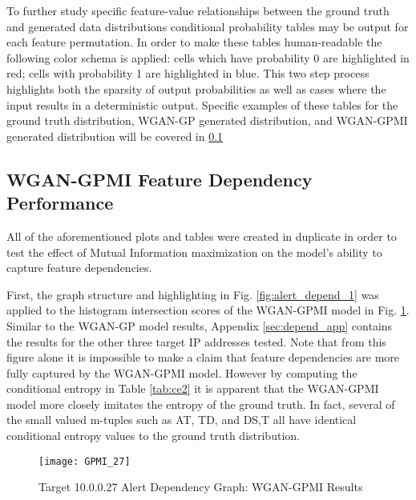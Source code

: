 To further study specific feature-value relationships between the ground truth and generated data distributions conditional probability tables may be output for each feature permutation. In order to make these tables human-readable the following color schema is applied: cells which have probability 0 are highlighted in red; cells with probability 1 are highlighted in blue. This two step process highlights both the sparsity of output probabilities as well as cases where the input results in a deterministic output. Specific examples of these tables for the ground truth distribution, WGAN-GP generated distribution, and WGAN-GPMI generated distribution will be covered in \ref{sec:gpmi_dep}

\subsection{WGAN-GPMI Feature Dependency Performance}
\label{sec:gpmi_dep}

All of the aforementioned plots and tables were created in duplicate in order to test the effect of Mutual Information maximization on the model's ability to capture feature dependencies.

First, the graph structure and highlighting in Fig. \ref{fig:alert_depend_1} was applied to the histogram intersection scores of the WGAN-GPMI model in Fig. \ref{fig:alert_depend_5}. Similar to the WGAN-GP model results, Appendix \ref{sec:depend_app} contains the results for the other three target IP addresses tested. Note that from this figure alone it is impossible to make a claim that feature dependencies are more fully captured by the WGAN-GPMI model. However by computing the conditional entropy in Table \ref{tab:ce2} it is apparent that the WGAN-GPMI model more closely imitates the entropy of the ground truth. In fact, several of the small valued m-tuples such as A{\given}T, T{\given}D, and D{\given}S,T all have identical conditional entropy values to the ground truth distribution.

\begin{figure}[!htbp]
	\centering
	\texttt{[image: GPMI\_27]}
	\caption{
		Target 10.0.0.27 Alert Dependency Graph: WGAN-GPMI Results
	}
	\label{fig:alert_depend_5}
\end{figure}

